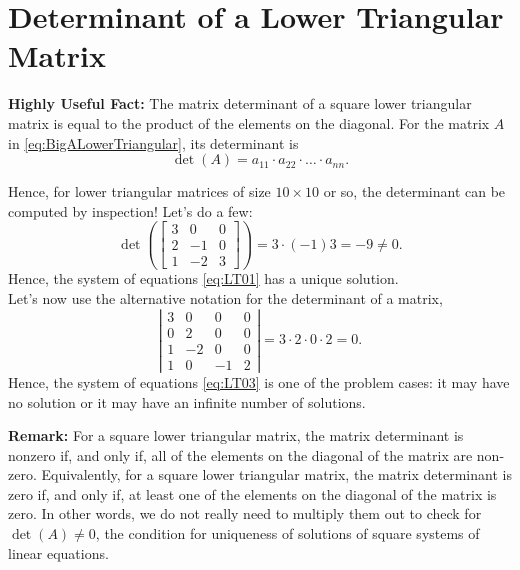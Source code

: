 \section{Determinant of a Lower Triangular Matrix}

\begin{tcolorbox}
\textbf{Highly Useful Fact:} The matrix determinant of a square lower triangular matrix is equal to the product of the elements on the diagonal. For the matrix $A$ in \eqref{eq:BigALowerTriangular}, its determinant is 
\begin{equation}
   \det(A) = a_{11} \cdot a_{22} \cdot \ldots \cdot a_{nn}. 
\end{equation}
\end{tcolorbox}

Hence, for lower triangular matrices of size $10 \times 10$ or so, the determinant can be computed by inspection! Let's do a few:
$$\det\left( \left[\begin{array}{rrr} 3 & 0 & 0\\
2 & -1 & 0 \\ 1 & -2 & 3  \end{array}\right] \right) = 3 \cdot (-1) 3 = -9 \neq 0.$$
Hence, the system of equations \eqref{eq:LT01} has a unique solution.\\

Let's now use the alternative notation for the determinant of a matrix, 
$$ \left|\begin{array}{rrrr} 3 & 0 & 0 & 0\\
0 & 2 & 0 & 0\\ 1 & -2& 0 &0 \\ 1 & 0 & -1 & 2  \end{array}\right| = 3\cdot 2\cdot 0 \cdot 2 = 0.  $$
Hence, the system of equations \eqref{eq:LT03} is one of the problem cases: it may have no solution or it may have an infinite number of solutions.\\

\begin{tcolorbox}
\textbf{Remark:} For a square lower triangular matrix, the matrix determinant is nonzero if, and only if, all of the elements on the diagonal of the matrix are non-zero. Equivalently, for a square lower triangular matrix, the matrix determinant is zero if, and only if, at least one of the elements on the diagonal of the matrix is zero. In other words, we do not really need to multiply them out to check for $\det(A) \neq 0$, the condition for uniqueness of solutions of square systems of linear equations.
\end{tcolorbox}

